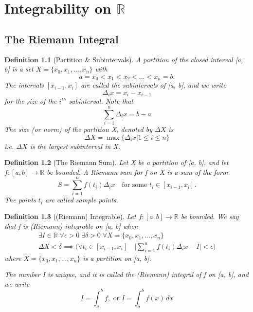 \documentclass[11pt, oneside]{book}
\theoremstyle{break}
\newtheorem{defn}{Definition}[section]
\newcommand{\bb}[1]{\mathbb{#1}}			%
\begin{document}
\chapter{Integrability on \texorpdfstring{$\bb{R}$}{R}}

\section{The Riemann Integral}

\begin{defn}[Partition \& Subintervals]
	A partition of the closed interval [a, b] is a set $X = \{x_0, x_1, ..., x_n\}$ with
	\[
		a = x_0 < x_1 < x_2 < \hdots < x_n = b.
	\]
	The intervals $[x_{i-1}, x_i]$ are called the subintervals of [a, b], and we write
	\[
		\Delta_i x = x_i - x_{i-1}
	\]
	for the size of the $i^{th}$ subinterval. Note that
	\[
		\sum_{i=1}^{n} \Delta_i x = b - a
	\]
	The size (or norm) of the partition X, denoted by $\Delta X$ is
	\[
		\Delta X = \max \{\Delta_i x | 1 \leq i \leq n\}
	\]
	i.e. $\Delta X$ is the largest subinterval in X.
\end{defn}

\begin{defn}[The Riemann Sum]
	Let X be a partition of [a, b], and let $f: [a, b] \to \bb{R}$ be bounded. A Riemann sum for f on X is a sum of the form
	\[
		S = \sum_{i=1}^{n} f(t_i) \Delta_i x \quad \text{for some } t_i \in [x_{i - 1}, x_i].
	\]
	The points $t_i$ are called sample points.
\end{defn}

\begin{defn}[(Riemann) Integrable]
	Let $f: [a, b] \to \bb{R}$ be bounded. We say that f is (Riemann) integrable on [a, b] when
	\begin{gather*}
		\exists I \in \bb{R} \; \forall \epsilon > 0 \; \exists \delta > 0 \; \forall X = \{x_0, x_1, ..., x_n\} \\
		\Delta X < \delta \implies \bigg(\forall t_i \in [x_{i -1}, x_i] \quad \Bigg|\sum_{i=1}^{n} f(t_i) \Delta_i x - I \Bigg| < \epsilon \bigg)
	\end{gather*}
	where $X = \{x_0, x_1, ..., x_n\}$ is a partition on [a, b].

	The number I is unique, and it is called the (Riemann) integral of f on [a, b], and we write
	\[
		I = \int_{a}^{b} f, \text{ or } I = \int_{a}^{b} f(x) \, dx
	\]
\end{defn}
\end{document}
